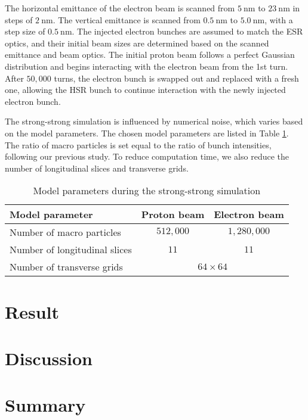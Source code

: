 \documentclass{article}
\begin{document}
The horizontal emittance of the electron beam is scanned from $5~\mathrm{nm}$ to 
$23~\mathrm{nm}$ in steps of $2~\mathrm{nm}$. The vertical emittance is scanned 
from $0.5~\mathrm{nm}$ to $5.0~\mathrm{nm}$, with a step size of $0.5~\mathrm{nm}$. 
The injected electron bunches are assumed to match the ESR optics, and their initial 
beam sizes are determined based on the scanned emittance and beam optics. 
The initial proton beam follows a perfect Gaussian distribution and begins interacting 
with the electron beam from the 1st turn. After $50,000$ turns, the electron bunch 
is swapped out and replaced with a fresh one, allowing the HSR bunch to 
continue interaction with the newly injected electron bunch.

The strong-strong simulation is influenced by numerical noise, which varies based on 
the model parameters. The chosen model parameters are listed in Table \ref{tab:model}.
The ratio of macro particles is set equal to the ratio of bunch intensities, 
following our previous study. To reduce computation time, we also reduce the 
number of longitudinal slices and transverse grids.
\begin{table}
    \centering
    \caption{Model parameters during the strong-strong simulation\\}
    \begin{tabular}{lcc}
    \toprule
    Model parameter & Proton beam & Electron beam\\
    \midrule
    Number of macro particles & $512,000$ & $1,280,000$\\
    Number of longitudinal slices & $11$ & $11$\\
    Number of transverse grids & \multicolumn{2}{c}{$64\times 64$}\\
    \bottomrule
    \end{tabular}
    \label{tab:model}
\end{table}

\section{Result}

\section{Discussion}

\section{Summary}



\end{document}
